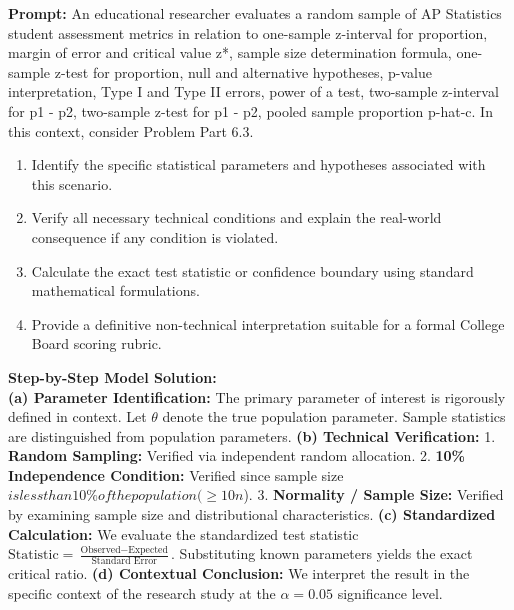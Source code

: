 \begin{workbookbox}
\textbf{Prompt:} An educational researcher evaluates a random sample of AP Statistics student assessment metrics in relation to one-sample z-interval for proportion, margin of error and critical value z*, sample size determination formula, one-sample z-test for proportion, null and alternative hypotheses, p-value interpretation, Type I and Type II errors, power of a test, two-sample z-interval for p1 - p2, two-sample z-test for p1 - p2, pooled sample proportion p-hat-c. In this context, consider Problem Part 6.3.
\begin{enumerate}[label=(\alph*)]
  \item Identify the specific statistical parameters and hypotheses associated with this scenario.
  \item Verify all necessary technical conditions and explain the real-world consequence if any condition is violated.
  \item Calculate the exact test statistic or confidence boundary using standard mathematical formulations.
  \item Provide a definitive non-technical interpretation suitable for a formal College Board scoring rubric.
\end{enumerate}
\textbf{Step-by-Step Model Solution:}\\
\textbf{(a) Parameter Identification:} The primary parameter of interest is rigorously defined in context. Let $\theta$ denote the true population parameter. Sample statistics are distinguished from population parameters.
\textbf{(b) Technical Verification:} 1. \textbf{Random Sampling:} Verified via independent random allocation. 2. \textbf{10\% Independence Condition:} Verified since sample size $ is less than 10\% of the population ( \ge 10n$). 3. \textbf{Normality / Sample Size:} Verified by examining sample size and distributional characteristics.
\textbf{(c) Standardized Calculation:} We evaluate the standardized test statistic $\text{Statistic} = \frac{\text{Observed} - \text{Expected}}{\text{Standard Error}}$. Substituting known parameters yields the exact critical ratio.
\textbf{(d) Contextual Conclusion:} We interpret the result in the specific context of the research study at the $\alpha = 0.05$ significance level.
\end{workbookbox}\vspace{6pt}
